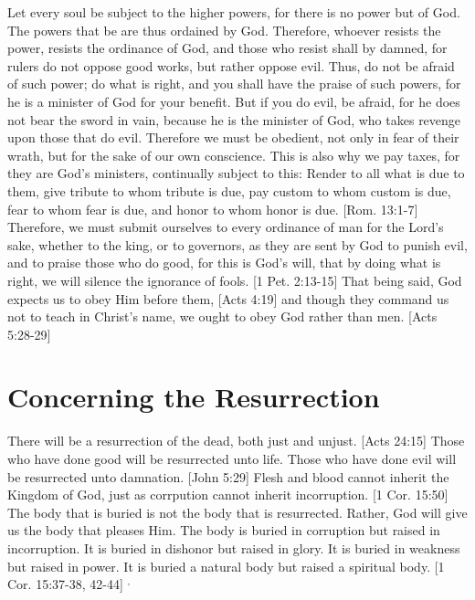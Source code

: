 \documentclass[../main.tex] {subfiles}
\begin{document}
	Let every soul be subject to the higher powers, for there is no power but of God. The powers that be are thus ordained by God. Therefore, whoever resists the power, resists the ordinance of God, and those who resist shall by damned, for rulers do not oppose good works, but rather oppose evil. Thus, do not be afraid of such power; do what is right, and you shall have the praise of such powers, for he is a minister of God for your benefit. But if you do evil, be afraid, for he does not bear the sword in vain, because he is the minister of God, who takes revenge upon those that do evil. Therefore we must be obedient, not only in fear of their wrath, but for the sake of our own conscience. This is also why we pay taxes, for they are God's ministers, continually subject to this: Render to all what is due to them, give tribute to whom tribute is due, pay custom to whom custom is due, fear to whom fear is due, and honor to whom honor is due. [Rom. 13:1-7]  Therefore, we must submit ourselves to every ordinance of man for the Lord's sake, whether to the king, or to governors, as they are sent by God to punish evil, and to praise those who do good, for this is God's will, that by doing what is right, we will silence the ignorance of fools. [1 Pet. 2:13-15]  That being said, God expects us to obey Him before them, [Acts 4:19]  and though they command us not to teach in Christ's name, we ought to obey God rather than men. [Acts 5:28-29] 

	\section{Concerning the Resurrection}

	There will be a resurrection of the dead, both just and unjust. [Acts 24:15]  Those who have done good will be resurrected unto life. Those who have done evil will be resurrected unto damnation. [John 5:29]  Flesh and blood cannot inherit the Kingdom of God, just as corrpution cannot inherit incorruption. [1 Cor. 15:50]  The body that is buried is not the body that is resurrected. Rather, God will give us the body that pleases Him. The body is buried in corruption but raised in incorruption. It is buried in dishonor but raised in glory. It is buried in weakness but raised in power. It is buried a natural body but raised a spiritual body. [1 Cor. 15:37-38, 42-44] $^{,}$



	\theendnotes
	\setcounter{endnote}{0}



	
\end{document}
